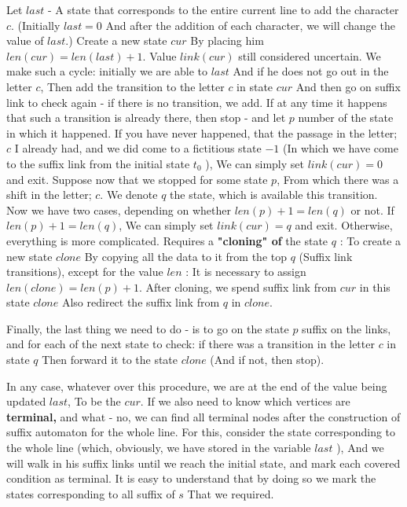 Let $last$ - A state that corresponds to the entire current line to add the character $c$. (Initially $last = 0$ And after the addition of each character, we will change the value of $last$.)
Create a new state $cur$ By placing him $len (cur) = len (last) + 1$. Value $link (cur)$ still considered uncertain.
We make such a cycle: initially we are able to $last$ And if he does not go out in the letter $c$, Then add the transition to the letter $c$ in state $cur$ And then go on suffix link to check again - if there is no transition, we add. If at any time it happens that such a transition is already there, then stop - and let $p$ number of the state in which it happened.
If you have never happened, that the passage in the letter; $c$ I already had, and we did come to a fictitious state $-1$ (In which we have come to the suffix link from the initial state $t_0$ ), We can simply set $link (cur) = 0$ and exit.
Suppose now that we stopped for some state $p$, From which there was a shift in the letter; $c$. We denote $q$ the state, which is available this transition.
Now we have two cases, depending on whether $len (p) + 1 = len (q)$ or not.
If $len (p) + 1 = len (q)$, We can simply set $link (cur) = q$ and exit.
Otherwise, everything is more complicated. Requires a \textbf{"cloning" of} the state $q$ : To create a new state $clone$ By copying all the data to it from the top $q$ (Suffix link transitions), except for the value $len$ : It is necessary to assign $len (clone) = len (p) + 1$.
After cloning, we spend suffix link from $cur$ in this state $clone$ Also redirect the suffix link from $q$ in $clone$.

Finally, the last thing we need to do - is to go on the state $p$ suffix on the links, and for each of the next state to check: if there was a transition in the letter $c$ in state $q$ Then forward it to the state $clone$ (And if not, then stop).

In any case, whatever over this procedure, we are at the end of the value being updated $last$, To be the $cur$.
If we also need to know which vertices are \textbf{terminal,} and what - no, we can find all terminal nodes after the construction of suffix automaton for the whole line. For this, consider the state corresponding to the whole line (which, obviously, we have stored in the variable $last$ ), And we will walk in his suffix links until we reach the initial state, and mark each covered condition as terminal. It is easy to understand that by doing so we mark the states corresponding to all suffix of $s$ That we required.

